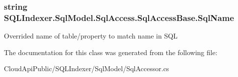 \hypertarget{class_s_q_l_indexer_1_1_sql_model_1_1_sql_access_1_1_sql_access_base_a2c7e02551d342cb1ec7e03cb91100e65}{
\subsubsection[{Sql\-Name}]{\setlength{\rightskip}{0pt plus 5cm}string S\-Q\-L\-Indexer.\-Sql\-Model.\-Sql\-Access.\-Sql\-Access\-Base.\-Sql\-Name\hspace{0.3cm}{\ttfamily [get]}}}\label{class_s_q_l_indexer_1_1_sql_model_1_1_sql_access_1_1_sql_access_base_a2c7e02551d342cb1ec7e03cb91100e65}


Overrided name of table/property to match name in S\-Q\-L 



The documentation for this class was generated from the following file\-:\begin{DoxyCompactItemize}
\item 
Cloud\-Api\-Public/\-S\-Q\-L\-Indexer/\-Sql\-Model/Sql\-Accessor.\-cs\end{DoxyCompactItemize}
